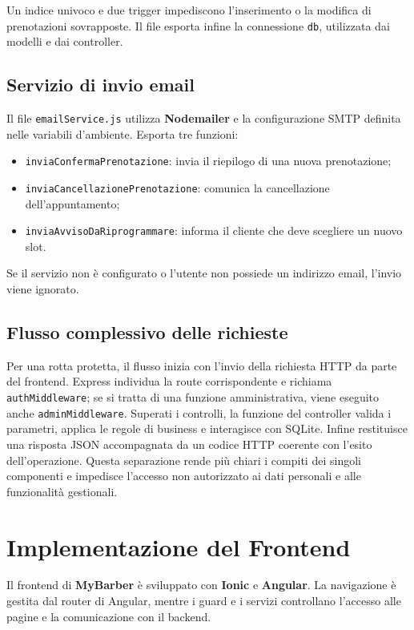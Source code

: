 \documentclass[12pt,a4paper]{article}
\begin{document}
Un indice univoco e due trigger impediscono l'inserimento o la modifica di
prenotazioni sovrapposte. Il file esporta infine la connessione
\texttt{db}, utilizzata dai modelli e dai controller.

\subsection{Servizio di invio email}
Il file \texttt{emailService.js} utilizza \textbf{Nodemailer} e la
configurazione SMTP definita nelle variabili d'ambiente. Esporta tre funzioni:
\begin{itemize}
    \item \texttt{inviaConfermaPrenotazione}: invia il riepilogo di una nuova prenotazione;
    \item \texttt{inviaCancellazionePrenotazione}: comunica la cancellazione dell'appuntamento;
    \item \texttt{inviaAvvisoDaRiprogrammare}: informa il cliente che deve scegliere un nuovo slot.
\end{itemize}
Se il servizio non è configurato o l'utente non possiede un indirizzo email,
l'invio viene ignorato.

\subsection{Flusso complessivo delle richieste}
Per una rotta protetta, il flusso inizia con l'invio della richiesta HTTP da
parte del frontend. Express individua la route corrispondente e richiama
\texttt{authMiddleware}; se si tratta di una funzione amministrativa, viene
eseguito anche \texttt{adminMiddleware}. Superati i controlli, la funzione del controller
valida i parametri, applica le regole di business e interagisce con SQLite.
Infine restituisce una risposta JSON accompagnata da un codice HTTP coerente
con l'esito dell'operazione. Questa separazione rende più chiari i compiti dei
singoli componenti e impedisce l'accesso non autorizzato ai dati personali e
alle funzionalità gestionali.

\newpage

\section{Implementazione del Frontend}
Il frontend di \textbf{MyBarber} è sviluppato con \textbf{Ionic} e
\textbf{Angular}. La navigazione è gestita dal router di Angular, mentre i
guard e i servizi controllano l'accesso alle pagine e la comunicazione con il
backend.
\end{document}
